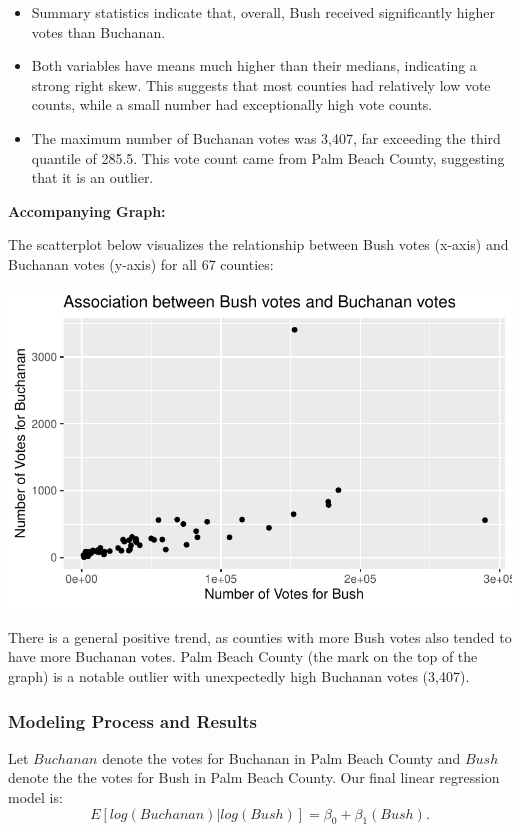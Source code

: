 \documentclass[
  letterpaper,
  DIV=11,
  numbers=noendperiod]{scrartcl}
\begin{document}
\begin{itemize}
\item
  Summary statistics indicate that, overall, Bush received significantly
  higher votes than Buchanan.
\item
  Both variables have means much higher than their medians, indicating a
  strong right skew. This suggests that most counties had relatively low
  vote counts, while a small number had exceptionally high vote counts.
\item
  The maximum number of Buchanan votes was 3,407, far exceeding the
  third quantile of 285.5. This vote count came from Palm Beach County,
  suggesting that it is an outlier.
\end{itemize}

\textbf{Accompanying Graph:}

The scatterplot below visualizes the relationship between Bush votes
(x-axis) and Buchanan votes (y-axis) for all 67 counties:

\includegraphics{SDS-291-case-study-1_files/figure-pdf/unnamed-chunk-3-1.pdf}

There is a general positive trend, as counties with more Bush votes also
tended to have more Buchanan votes. Palm Beach County (the mark on the
top of the graph) is a notable outlier with unexpectedly high Buchanan
votes (3,407).

\subsubsection{Modeling Process and
Results}\label{modeling-process-and-results}

Let \(Buchanan\) denote the votes for Buchanan in Palm Beach County and
\(Bush\) denote the the votes for Bush in Palm Beach County. Our final
linear regression model is:
\[E[log(Buchanan) | log(Bush)] = \beta_0 + \beta_1\left(Bush\right).\]
\end{document}
